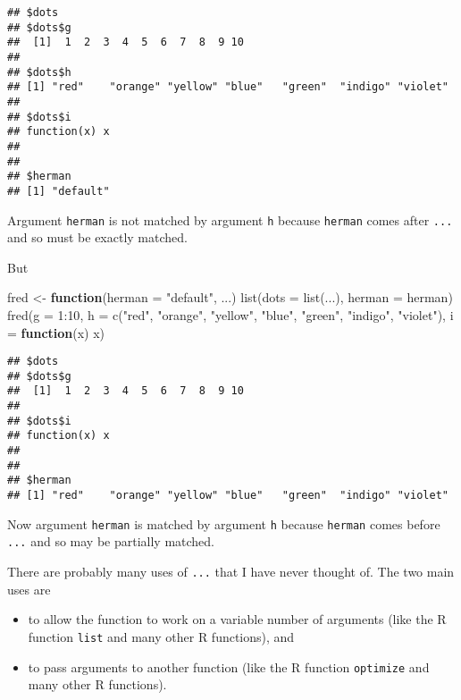 \documentclass[
]{article}
\newenvironment{Shaded}{\begin{snugshade}}{\end{snugshade}}
\newcommand{\AttributeTok}[1]{\textcolor[rgb]{0.77,0.63,0.00}{#1}}
\newcommand{\ControlFlowTok}[1]{\textcolor[rgb]{0.13,0.29,0.53}{\textbf{#1}}}
\newcommand{\DecValTok}[1]{\textcolor[rgb]{0.00,0.00,0.81}{#1}}
\newcommand{\FunctionTok}[1]{\textcolor[rgb]{0.00,0.00,0.00}{#1}}
\newcommand{\NormalTok}[1]{#1}
\newcommand{\OtherTok}[1]{\textcolor[rgb]{0.56,0.35,0.01}{#1}}
\newcommand{\SpecialCharTok}[1]{\textcolor[rgb]{0.00,0.00,0.00}{#1}}
\newcommand{\StringTok}[1]{\textcolor[rgb]{0.31,0.60,0.02}{#1}}
\providecommand{\tightlist}{%
  \setlength{\itemsep}{0pt}\setlength{\parskip}{0pt}}
\begin{document}
\begin{verbatim}
## $dots
## $dots$g
##  [1]  1  2  3  4  5  6  7  8  9 10
## 
## $dots$h
## [1] "red"    "orange" "yellow" "blue"   "green"  "indigo" "violet"
## 
## $dots$i
## function(x) x
## 
## 
## $herman
## [1] "default"
\end{verbatim}

Argument \texttt{herman} is not matched by argument \texttt{h} because
\texttt{herman} comes after \texttt{...} and so must be exactly matched.

But

\begin{Shaded}
\begin{Highlighting}[]
\NormalTok{fred }\OtherTok{\textless{}{-}} \ControlFlowTok{function}\NormalTok{(}\AttributeTok{herman =} \StringTok{"default"}\NormalTok{, ...)}
    \FunctionTok{list}\NormalTok{(}\AttributeTok{dots =} \FunctionTok{list}\NormalTok{(...), }\AttributeTok{herman =}\NormalTok{ herman)}
\FunctionTok{fred}\NormalTok{(}\AttributeTok{g =} \DecValTok{1}\SpecialCharTok{:}\DecValTok{10}\NormalTok{, }\AttributeTok{h =} \FunctionTok{c}\NormalTok{(}\StringTok{"red"}\NormalTok{, }\StringTok{"orange"}\NormalTok{, }\StringTok{"yellow"}\NormalTok{, }\StringTok{"blue"}\NormalTok{,}
    \StringTok{"green"}\NormalTok{, }\StringTok{"indigo"}\NormalTok{, }\StringTok{"violet"}\NormalTok{), }\AttributeTok{i =} \ControlFlowTok{function}\NormalTok{(x) x)}
\end{Highlighting}
\end{Shaded}

\begin{verbatim}
## $dots
## $dots$g
##  [1]  1  2  3  4  5  6  7  8  9 10
## 
## $dots$i
## function(x) x
## 
## 
## $herman
## [1] "red"    "orange" "yellow" "blue"   "green"  "indigo" "violet"
\end{verbatim}

Now argument \texttt{herman} is matched by argument \texttt{h} because
\texttt{herman} comes before \texttt{...} and so may be partially
matched.

There are probably many uses of \texttt{...} that I have never thought
of. The two main uses are

\begin{itemize}
\tightlist
\item
  to allow the function to work on a variable number of arguments (like
  the R function \texttt{list} and many other R functions), and
\item
  to pass arguments to another function (like the R function
  \texttt{optimize} and many other R functions).
\end{itemize}
\end{document}
